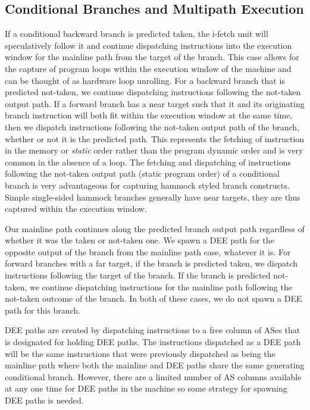 \documentclass[10pt,twocolumn,dvips]{article}
\begin{document}
\subsection{Conditional Branches and Multipath Execution}
%
If a conditional backward branch is predicted taken,
the i-fetch unit
will speculatively follow it and continue dispatching instructions
into the execution window for the mainline path from the target
of the branch.  
This case allows for the capture of program loops
within the execution window of the machine and can be thought of
as hardware loop unrolling.
For a backward branch that
is predicted not-taken, we continue dispatching instructions following the
not-taken output path.
If a forward branch has a near target such
that it and its originating branch instruction will both
fit within the execution window at the same time, 
then we dispatch instructions following the
not-taken output path of the branch, whether or not it is the predicted path.
This represents the fetching of instruction in the 
memory or \textit{static} order rather than the program dynamic order and
is very common in the absence of a loop.
The fetching and dispatching of instructions following the
not-taken output path (static program order) of a conditional
branch is very advantageous for 
capturing hammock styled branch constructs.  
Simple single-sided hammock branches generally have near targets,
they are thus captured within the execution window.

Our mainline path continues along the predicted branch output path
regardless of whether it was the taken or not-taken one.  
We spawn a DEE path
for the opposite output of the branch from
the mainline path case, whatever it is.
For forward branches with a far target,
if the branch is predicted taken, we dispatch instructions following the target
of the branch.  If the branch is predicted not-taken, we continue
dispatching instructions for the mainline path following the not-taken
outcome of the branch.  In both of these cases, we do not
spawn a DEE path for this branch.

DEE paths are created by dispatching instructions to a 
free column of ASes that is designated for holding DEE paths.
The instructions dispatched as a DEE path will be the same
instructions that were previously dispatched as being the
mainline path where both the mainline and DEE paths share the
same generating conditional branch.
However, there are a limited number of AS columns
available at any one time for DEE paths in the machine so some
strategy for spawning DEE paths is needed.
\end{document}
